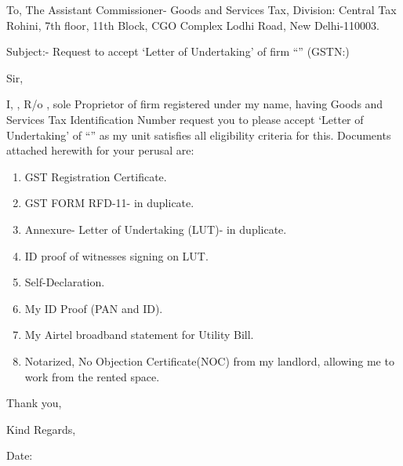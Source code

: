 \documentclass[a4paper,11pt] {report}
\begin{document}
\vspace*{2cm}
To,\newline
The Assistant Commissioner- Goods and Services Tax,\newline
Division: Central Tax Rohini,\newline
7th floor, 11th Block, \newline
CGO Complex Lodhi Road, \newline
New Delhi-110003. 

Subject:- Request to accept ‘Letter of Undertaking’ of firm “\myfirm” (GSTN:\mygstin)

\bigbreak

Sir, \newline

I, \myname, R/o \underline{\myaddress}, sole Proprietor of firm
registered under my name, {\bf{\myfirm}} having Goods and Services Tax
Identification Number {\bf{\underline{\mygstin}}} request you to
please accept ‘Letter of Undertaking’ of “\myfirm” as my unit
satisfies all eligibility criteria for this. Documents attached
herewith for your perusal are:
\begin{enumerate}
\item GST Registration Certificate.
\item GST FORM RFD-11- in duplicate.
\item Annexure- Letter of Undertaking (LUT)- in duplicate.
\item ID proof of witnesses signing on LUT.
\item Self-Declaration.
\item My ID Proof (PAN and ID).
\item My Airtel broadband statement for Utility Bill.
\item Notarized, No Objection Certificate(NOC) from my landlord,
  allowing me to work from the rented space.
\end{enumerate} 
Thank you,

Kind Regards, \bigbreak \bigbreak

\myname

Date: \DayAfter[1]
\end{document}
